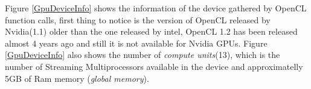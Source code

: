 \par{Figure \ref{GpuDeviceInfo} shows the information of the device gathered by OpenCL function calls, first thing to notice is 
    the version of OpenCL released by Nvidia(1.1) older than the one released by intel, OpenCL 1.2 has been released almost 4 years
    ago and still it is not available for Nvidia GPUs. Figure \ref{GpuDeviceInfo} also shows the number of \emph{compute units}(13),
    which is the number of Streaming Multiprocessors available in the device and approximatelly 5GB of Ram memory
    (\emph{global memory}).}




